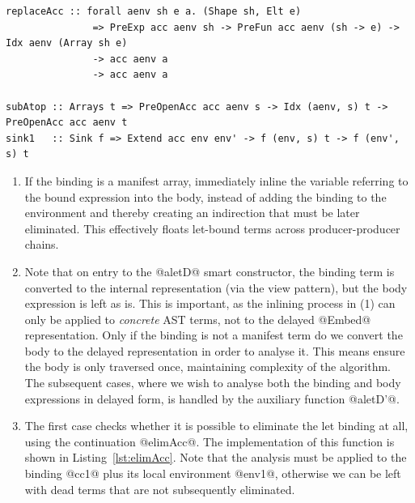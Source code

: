 \begin{lstlisting}[style=haskell_float
    ,label=lst:aletD
    ,caption={Smart constructor for let bindings}]
    replaceAcc :: forall aenv sh e a. (Shape sh, Elt e)
               => PreExp acc aenv sh -> PreFun acc aenv (sh -> e) -> Idx aenv (Array sh e)
               -> acc aenv a
               -> acc aenv a

subAtop :: Arrays t => PreOpenAcc acc aenv s -> Idx (aenv, s) t -> PreOpenAcc acc aenv t
sink1   :: Sink f => Extend acc env env' -> f (env, s) t -> f (env', s) t
\end{lstlisting}

\begin{enumerate}
\item If the binding is a manifest array, immediately inline the variable
    referring to the bound expression into the body, instead of adding the
    binding to the environment and thereby creating an indirection that must be
    later eliminated. This effectively floats let-bound terms across
    producer-producer chains.

\item Note that on entry to the @aletD@ smart constructor, the binding term is
    converted to the internal representation (via the view pattern), but the
    body expression is left as is. This is important, as the inlining process in
    (1) can only be applied to \emph{concrete} AST terms, not to the delayed
    @Embed@ representation. Only if the binding is not a manifest term do we
    convert the body to the delayed representation in order to analyse it. This
    means ensure the body is only traversed once, maintaining complexity of the
    algorithm. The subsequent cases, where we wish to analyse both the binding
    and body expressions in delayed form, is handled by the auxiliary function
    @aletD'@.

\item The first case checks whether it is possible to eliminate the let binding
    at all, using the continuation @elimAcc@. The implementation of this
    function is shown in Listing~\ref{lst:elimAcc}. Note that the analysis must
    be applied to the binding @cc1@ plus its local environment @env1@, otherwise
    we can be left with dead terms that are not subsequently eliminated.


\end{enumerate}
